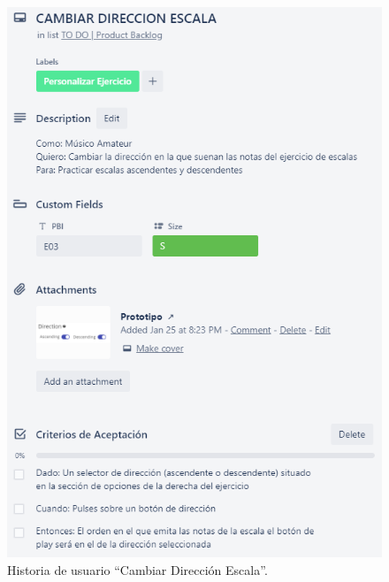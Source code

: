 \documentclass[12pt,twoside,titlepage]{report}
\begin{document}
{\begin{figure}[H]
    \centering
    \includegraphics[scale=1.3]{Scrum/User Stories/EscalasDireccion}
    \caption{Historia de usuario ``Cambiar Dirección Escala''.}
    \label{fig:EscalasDireccion}
\end{figure}

}
\end{document}
